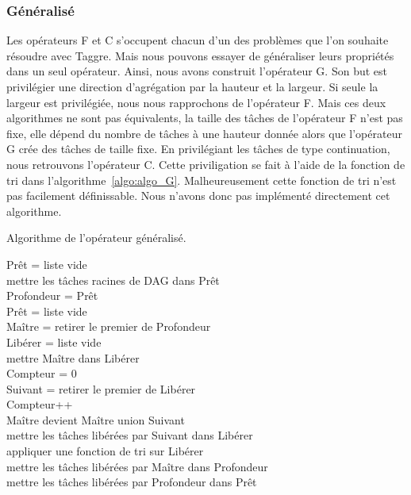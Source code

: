 \subsubsection{Généralisé}
Les opérateurs F et C s'occupent chacun d'un des problèmes que l'on souhaite résoudre avec Taggre.
%
Mais nous pouvons essayer de généraliser leurs propriétés dans un seul opérateur.
%
Ainsi, nous avons construit l'opérateur G.
%
Son but est privilégier une direction d'agrégation par la hauteur et la largeur.
%
Si seule la largeur est privilégiée, nous nous rapprochons de l'opérateur F.
%
Mais ces deux algorithmes ne sont pas équivalents, la taille des tâches de l'opérateur F n'est pas fixe, elle dépend du nombre de tâches à une hauteur donnée alors que l'opérateur G crée des tâches de taille fixe.
%
En privilégiant les tâches de type continuation, nous retrouvons l'opérateur C.
%
Cette priviligation se fait à l'aide de la fonction de tri dans l'algorithme~\ref{algo:algo_G}.
%
Malheureusement cette fonction de tri n'est pas facilement définissable.
%
Nous n'avons donc pas implémenté directement cet algorithme.

\begin{algorithm}
  \caption{Algorithme de l'opérateur généralisé.}
  \label{algo:algo_G}
  {\sc Prêt} = liste vide \\
  mettre les tâches racines de DAG dans {\sc Prêt} \\
   {
    {\sc Profondeur} = {\sc Prêt} \\
    {\sc Prêt} = liste vide \\
     {
      {\sc Maître} = retirer le premier de {\sc Profondeur} \\
      {\sc Libérer} = liste vide \\
      mettre {\sc Maître} dans {\sc Libérer} \\
      {\sc Compteur} = 0 \\
       {
        {\sc Suivant} = retirer le premier de {\sc Libérer} \\
        {\sc Compteur}++\\
        {\sc Maître} devient {\sc Maître} union {\sc Suivant}\\
        mettre les tâches libérées par {\sc Suivant} dans {\sc Libérer} \\
        appliquer une fonction de tri sur {\sc Libérer} \\
      }
      mettre les tâches libérées par {\sc Maître} dans {\sc Profondeur} \\
    }
    mettre les tâches libérées par {\sc Profondeur} dans {\sc Prêt}\\
  }
\end{algorithm}
